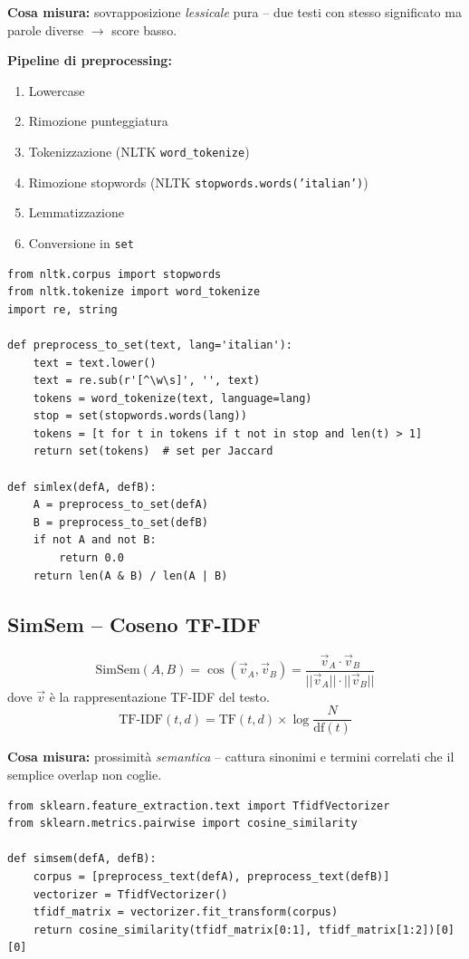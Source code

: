 \documentclass[12pt,a4paper]{article}
\begin{document}
\textbf{Cosa misura:} sovrapposizione \emph{lessicale} pura -- due testi con stesso significato ma parole diverse $\to$ score basso.

\textbf{Pipeline di preprocessing:}
\begin{enumerate}
  \item Lowercase
  \item Rimozione punteggiatura
  \item Tokenizzazione (NLTK \texttt{word\_tokenize})
  \item Rimozione stopwords (NLTK \texttt{stopwords.words('italian')})
  \item Lemmatizzazione
  \item Conversione in \texttt{set}
\end{enumerate}

\begin{codebox}
\begin{lstlisting}[style=python]
from nltk.corpus import stopwords
from nltk.tokenize import word_tokenize
import re, string

def preprocess_to_set(text, lang='italian'):
    text = text.lower()
    text = re.sub(r'[^\w\s]', '', text)
    tokens = word_tokenize(text, language=lang)
    stop = set(stopwords.words(lang))
    tokens = [t for t in tokens if t not in stop and len(t) > 1]
    return set(tokens)  # set per Jaccard

def simlex(defA, defB):
    A = preprocess_to_set(defA)
    B = preprocess_to_set(defB)
    if not A and not B:
        return 0.0
    return len(A & B) / len(A | B)
\end{lstlisting}
\end{codebox}

\subsection{SimSem -- Coseno TF-IDF}

\begin{formulabox}
\[
\text{SimSem}(A, B) = \cos(\vec{v}_A, \vec{v}_B) = \frac{\vec{v}_A \cdot \vec{v}_B}{||\vec{v}_A|| \cdot ||\vec{v}_B||}
\]
dove $\vec{v}$ \`e la rappresentazione TF-IDF del testo.
\[
\text{TF-IDF}(t, d) = \text{TF}(t,d) \times \log\frac{N}{\text{df}(t)}
\]
\end{formulabox}

\textbf{Cosa misura:} prossimit\`a \emph{semantica} -- cattura sinonimi e termini correlati che il semplice overlap non coglie.

\begin{codebox}
\begin{lstlisting}[style=python]
from sklearn.feature_extraction.text import TfidfVectorizer
from sklearn.metrics.pairwise import cosine_similarity

def simsem(defA, defB):
    corpus = [preprocess_text(defA), preprocess_text(defB)]
    vectorizer = TfidfVectorizer()
    tfidf_matrix = vectorizer.fit_transform(corpus)
    return cosine_similarity(tfidf_matrix[0:1], tfidf_matrix[1:2])[0][0]
\end{lstlisting}
\end{codebox}
\end{document}
